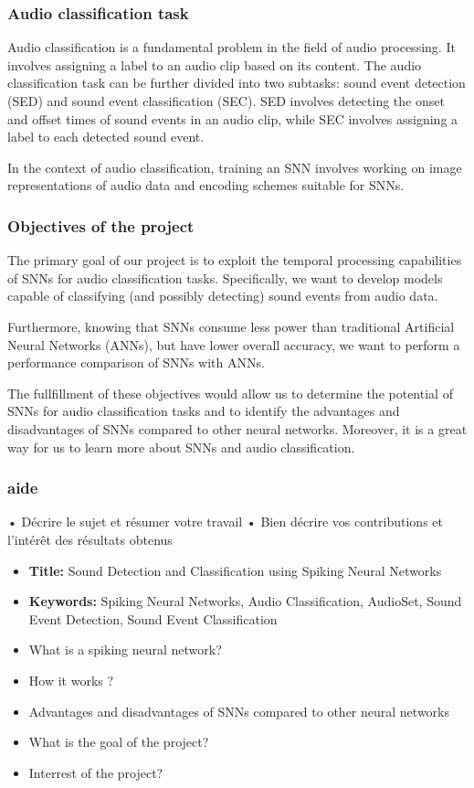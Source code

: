 \documentclass[11pt]{article}
\begin{document}
\pagebreak

\subsubsection{Audio classification task}

Audio classification is a fundamental problem in the field of audio processing. It involves assigning a label to an audio clip based on its content. The audio classification task can be further divided into two subtasks: sound event detection (SED) and sound event classification (SEC). SED involves detecting the onset and offset times of sound events in an audio clip, while SEC involves assigning a label to each detected sound event.

In the context of audio classification, training an SNN involves working on image representations of audio data and encoding schemes suitable for SNNs.


\subsubsection{Objectives of the project}

The primary goal of our project is to exploit the temporal processing capabilities of SNNs for audio classification tasks. Specifically, we want to develop models capable of classifying (and possibly detecting) sound events from audio data.

Furthermore, knowing that SNNs consume less power than traditional Artificial Neural Networks (ANNs), but have lower overall accuracy, we want to perform a performance comparison of SNNs with ANNs.

The fullfillment of these objectives would allow us to determine the potential of SNNs for audio classification tasks and to identify the advantages and disadvantages of SNNs compared to other neural networks. Moreover, it is a great way for us to learn more about SNNs and audio classification.

\subsubsection*{aide}
•	Décrire le sujet et résumer votre travail
•	Bien décrire vos contributions et l’intérêt des résultats obtenus


\begin{itemize}
  \item \textbf{Title:} Sound Detection and Classification using Spiking Neural Networks
  \item \textbf{Keywords:} Spiking Neural Networks, Audio Classification, AudioSet, Sound Event Detection, Sound Event Classification
  \item What is a spiking neural network?
  \item How it works ?
  \item Advantages and disadvantages of SNNs compared to other neural networks
  \item What is the goal of the project?
  \item Interrest of the project?
\end{itemize}
\end{document}
